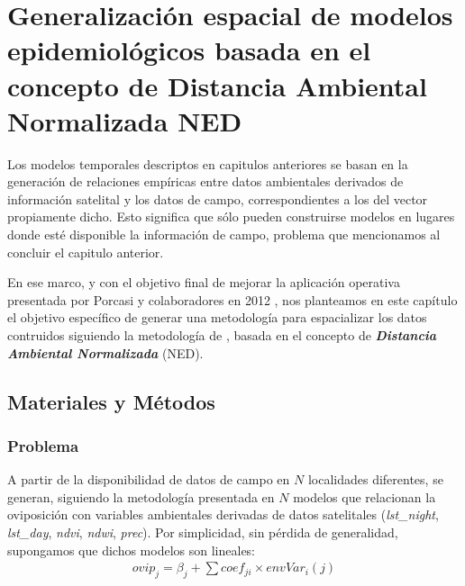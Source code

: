   



\justifying

\chapter{Generalización espacial de modelos epidemiológicos basada en el
        concepto de Distancia Ambiental Normalizada NED}

  \par Los modelos temporales descriptos en capitulos anteriores se basan en la
    generación de relaciones empíricas entre datos ambientales derivados de
    información satelital y los datos de campo, correspondientes a los del vector
    propiamente dicho. Esto significa que sólo pueden construirse modelos en
    lugares donde esté disponible la información de campo, problema que mencionamos
    al concluir el capitulo anterior.

  \par En ese marco, y con el objetivo final de mejorar la aplicación operativa
    presentada por Porcasi y colaboradores en 2012 \cite{porcasi_operative},
    nos planteamos en este capítulo el objetivo específico de generar
    una metodología para espacializar los datos contruidos siguiendo la
    metodología de \cite{german_temporal}, basada en el concepto de
    \textbf{\textit{Distancia Ambiental Normalizada}} (NED).


\section{Materiales y Métodos}

\subsection{Problema}

  \par A partir de la disponibilidad de datos de campo en $N$ localidades
    diferentes, se generan, siguiendo la metodología presentada en \cite{german_temporal}
    $N$ modelos que relacionan la oviposición con variables ambientales
    derivadas de datos satelitales (\textit{lst\_night}, \textit{lst\_day},
    \textit{ndvi}, \textit{ndwi}, \textit{prec}). Por simplicidad, sin pérdida
    de generalidad, supongamos que dichos modelos son lineales:
    \begin{align}
      ovip_{j} = \beta_{j} + \sum{}{coef_{ji} \times envVar_{i}(j)}
    \end{align}


